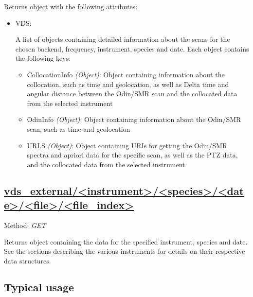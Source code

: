 Returns object with the following attributes:
\begin{itemize}
    \item VDS:

        A list of objects containing detailed information about the scans for
        the chosen backend, frequency, instrument, species and date.
        Each object contains the following keys:

        \begin{itemize}
            \item CollocationInfo \emph{(Object)}: Object containing
                information about the collocation, such as time and
                geolocation, as well as Delta time and angular distance between
                the Odin/SMR scan and the collocated data from the selected
                instrument
            \item OdinInfo \emph{(Object)}: Object containing information
                about the Odin/SMR scan, such as time and geolocation
            \item URLS \emph{(Object)}: Object containing URIs for getting the
            Odin/SMR spectra and apriori data for the specific scan, as
            well as the PTZ data, and the collocated data from the selected
            instrument
        \end{itemize}
\end{itemize}


\subsection{\url{vds_external/<instrument>/<species>/<date>/<file>/<file_index>}}
Method: \emph{GET}

Returns object containing the data for the specified instrument, species and
date. See the sections describing the various instruments for details on their
respective data structures.

\subsection{Typical usage}
\label{sec:api_usage}

